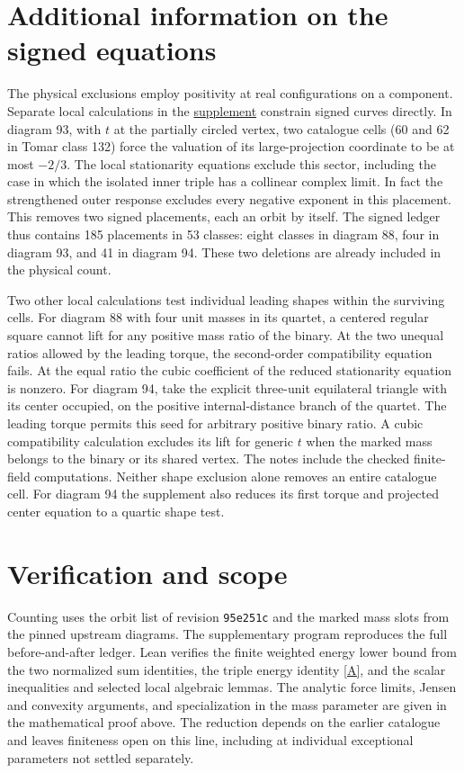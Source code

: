 \documentclass[11pt]{article}
\begin{document}
\section{Additional information on the signed equations}
The physical exclusions employ positivity at real configurations on a component. Separate local calculations in the \href{https://github.com/rongyulin/physics-open-problems-AI/tree/main/problems/planar-central-configurations/notes/physical-ends}{supplement} constrain signed curves directly. In diagram 93, with $t$ at the partially circled vertex, two catalogue cells (60 and 62 in Tomar class 132) force the valuation of its large-projection coordinate to be at most $-2/3$. The local stationarity equations exclude this sector, including the case in which the isolated inner triple has a collinear complex limit. In fact the strengthened outer response excludes every negative exponent in this placement. This removes two signed placements, each an orbit by itself. The signed ledger thus contains 185 placements in 53 classes: eight classes in diagram 88, four in diagram 93, and 41 in diagram 94. These two deletions are already included in the physical count.

Two other local calculations test individual leading shapes within the surviving cells. For diagram 88 with four unit masses in its quartet, a centered regular square cannot lift for any positive mass ratio of the binary. At the two unequal ratios allowed by the leading torque, the second-order compatibility equation fails. At the equal ratio the cubic coefficient of the reduced stationarity equation is nonzero. For diagram 94, take the explicit three-unit equilateral triangle with its center occupied, on the positive internal-distance branch of the quartet. The leading torque permits this seed for arbitrary positive binary ratio. A cubic compatibility calculation excludes its lift for generic $t$ when the marked mass belongs to the binary or its shared vertex. The notes include the checked finite-field computations. Neither shape exclusion alone removes an entire catalogue cell. For diagram 94 the supplement also reduces its first torque and projected center equation to a quartic shape test.
\section{Verification and scope}
Counting uses the orbit list of revision \texttt{95e251c} and the marked mass slots from the pinned upstream diagrams. The supplementary program reproduces the full before-and-after ledger. Lean verifies the finite weighted energy lower bound from the two normalized sum identities, the triple energy identity \eqref{A}, and the scalar inequalities and selected local algebraic lemmas. The analytic force limits, Jensen and convexity arguments, and specialization in the mass parameter are given in the mathematical proof above. The reduction depends on the earlier catalogue and leaves finiteness open on this line, including at individual exceptional parameters not settled separately.
\end{document}
